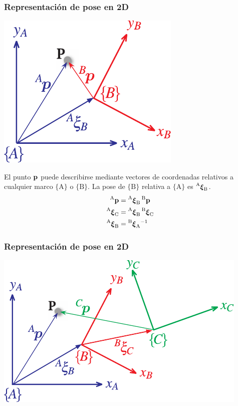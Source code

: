 \begin{frame}
    \frametitle{Representación de pose en 2D}
    \begin{center}
        \includegraphics[width=0.5\columnwidth]{./images/coordinate_frames.pdf}
    \end{center}


    El punto $\point$ puede describirse mediante vectores de coordenadas relativos a cualquier marco $\{\mathrm{A}\}$ o $\{\mathrm{B}\}$. La pose de $\{\mathrm{B}\}$ relativa a $\{\mathrm{A}\}$ es $\transform{A}{B}$.
    \begin{align*}
        \pointCoord{A} &= \transform{A}{B}\pointCoord{B}\\
        \transform{A}{C} &= \transform{A}{B}\transform{B}{C}\\
        \transform{A}{B} &= \transform{B}{A}^{-1}
    \end{align*}

\end{frame}


\begin{frame}
    \frametitle{Representación de pose en 2D}

    \includegraphics[width=\columnwidth]{./images/multiple_coordinate_frames_2d.pdf}

\end{frame}


